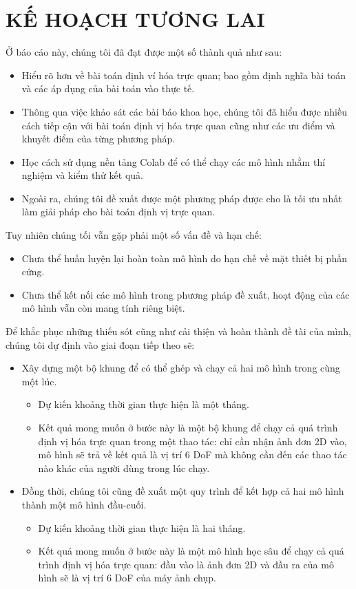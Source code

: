 \chapter{KẾ HOẠCH TƯƠNG LAI}

Ở báo cáo này, chúng tôi đã đạt được một số thành quả như sau:
\begin{itemize}
	\item Hiểu rõ hơn về bài toán định ví hóa trực quan; bao gồm định nghĩa bài toán và các áp dụng của bài toán vào thực tế.
	\item Thông qua việc khảo sát các bài báo khoa học, chúng tôi đã hiểu được nhiều cách tiếp cận với bài toán định vị hóa trực quan cũng như các ưu điểm và khuyết điểm của từng phương pháp.
	\item Học cách sử dụng nền tảng Colab để có thể chạy các mô hình nhằm thí nghiệm và kiểm thử kết quả.
	\item Ngoài ra, chúng tôi đề xuất được một phương pháp được cho là tối ưu nhất làm giải pháp cho bài toán định vị trực quan.
\end{itemize}

Tuy nhiên chúng tối vẫn gặp phải một số vấn đề và hạn chế:
\begin{itemize}
	\item Chưa thể huấn luyện lại hoàn toàn mô hình do hạn chế về mặt thiết bị phần cứng.
	\item Chưa thể kết nối các mô hình trong phương pháp đề xuất, hoạt động của các mô hình vẫn còn mang tính riêng biệt.
\end{itemize}

Để khắc phục những thiếu sót cũng như cải thiện và hoàn thành đề tài của mình, chúng tôi dự định vào giai đoạn tiếp theo sẽ:
\begin{itemize}
	\item Xây dựng một bộ khung để có thể ghép và chạy cả hai mô hình trong cùng một lúc.
	      \begin{itemize}
		      \item Dự kiến khoảng thời gian thực hiện là một tháng.
		      \item Kết quả mong muốn ở bước này là một bộ khung để chạy cả quá trình định vị hóa trực quan trong một thao tác: chỉ cần nhận ảnh đơn 2D vào, mô hình sẽ trả về kết quả là vị trí 6 DoF mà không cần đến các thao tác nào khác của người dùng trong lúc chạy.
	      \end{itemize}
	\item Đồng thời, chúng tôi cũng đề xuất một quy trình để kết hợp cả hai mô hình thành một mô hình đầu-cuối.
	      \begin{itemize}
		      \item Dự kiến khoảng thời gian thực hiện là hai tháng.
		      \item Kết quả mong muốn ở bước này là một mô hình học sâu để chạy cả quá trình định vị hóa trực quan: đầu vào là ảnh đơn 2D và đầu ra của mô hình sẽ là vị trí 6 DoF của máy ảnh chụp.
	      \end{itemize}
\end{itemize}
